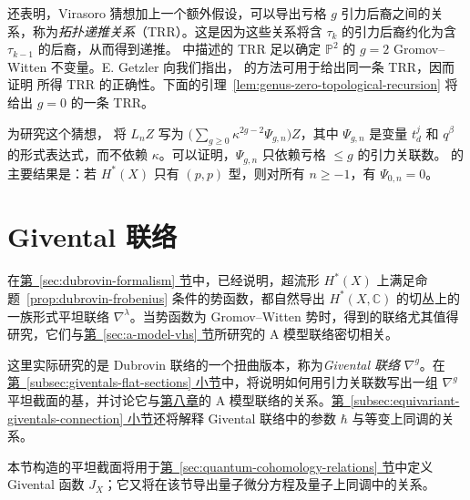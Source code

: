  还表明，Virasoro 猜想加上一个额外假设，可以导出亏格 $g$ 引力后裔之间的关系，称为\emph{拓扑递推关系}（TRR）。这是因为这些关系将含 $\tau_k$ 的引力后裔约化为含 $\tau_{k-1}$ 的后裔，从而得到递推。 中描述的 TRR 足以确定 $\mathbb P^2$ 的 $g=2$ Gromov--Witten 不变量。E. Getzler 向我们指出， 的方法可用于给出同一条 TRR，因而证明  所得 TRR 的正确性。下面的引理~\ref{lem:genus-zero-topological-recursion} 将给出 $g=0$ 的一条 TRR。

为研究这个猜想， 将 $L_nZ$ 写为 $\bigl(\sum_{g\ge0}\kappa^{2g-2}\Psi_{g,n}\bigr)Z$，其中 $\Psi_{g,n}$ 是变量 $t_d^j$ 和 $q^\beta$ 的形式表达式，而不依赖 $\kappa$。可以证明，$\Psi_{g,n}$ 只依赖亏格 $\le g$ 的引力关联数。 的主要结果是：若 $H^*(X)$ 只有 $(p,p)$ 型，则对所有 $n\ge-1$，有 $\Psi_{0,n}=0$。

\section{Givental 联络}\label{sec:giventals-connection}
在\hyperref[sec:dubrovin-formalism]{第~\ref*{sec:dubrovin-formalism} 节}中，已经说明，超流形 $H^*(X)$ 上满足命题~\ref{prop:dubrovin-frobenius} 条件的势函数，都自然导出 $H^*(X,\mathbb C)$ 的切丛上的一族形式平坦联络 $\nabla^\lambda$。当势函数为 Gromov--Witten 势时，得到的联络尤其值得研究，它们与\hyperref[sec:a-model-vhs]{第~\ref*{sec:a-model-vhs} 节}所研究的 A 模型联络密切相关。

这里实际研究的是 Dubrovin 联络的一个扭曲版本，称为\emph{Givental 联络} $\nabla^g$。在\hyperref[subsec:giventals-flat-sections]{第~\ref*{subsec:giventals-flat-sections} 小节}中，将说明如何用引力关联数写出一组 $\nabla^g$ 平坦截面的基，并讨论它与\hyperref[chap:quantum-cohomology]{第八章}的 A 模型联络的关系。\hyperref[subsec:equivariant-giventals-connection]{第~\ref*{subsec:equivariant-giventals-connection} 小节}还将解释 Givental 联络中的参数 $\hbar$ 与等变上同调的关系。

本节构造的平坦截面将用于\hyperref[sec:quantum-cohomology-relations]{第~\ref*{sec:quantum-cohomology-relations} 节}中定义 Givental 函数 $J_X$；它又将在该节导出量子微分方程及量子上同调中的关系。

